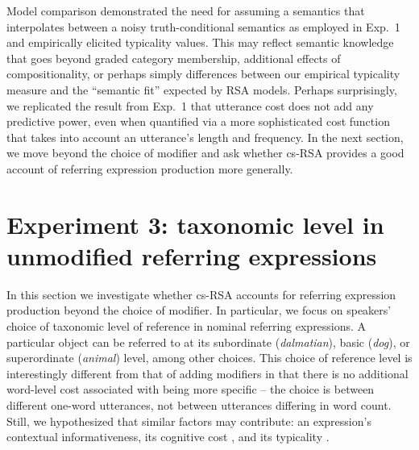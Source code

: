 \documentclass[11pt]{article}
\newcommand{\jd}[1]{\textcolor{Red}{[jd: #1]}}
\newcommand{\ndg}[1]{\textcolor{Green}{[ndg: #1]}}
\begin{document}
Model comparison demonstrated the need for assuming a semantics that interpolates between a noisy truth-conditional semantics as employed in Exp.~1 and empirically elicited typicality values. 
This may reflect semantic knowledge that goes beyond graded category membership, additional effects of compositionality, or perhaps simply differences between our empirical typicality measure and the ``semantic fit'' expected by RSA models.
Perhaps surprisingly, we replicated the result from Exp.~1 that utterance cost does not add any predictive power, even when quantified via a more sophisticated cost function that takes into account an utterance's length and frequency.
In the next section, we move beyond the choice of modifier and ask whether cs-RSA provides a good account of  referring expression production more generally.

\section[]{Experiment 3: taxonomic level in unmodified referring expressions}
\label{sec:nominal}

In this section we investigate whether cs-RSA accounts for referring expression production beyond the choice of modifier. 
In particular, we focus on speakers' choice of taxonomic level of reference in nominal referring expressions. 
A particular object can be referred to at its subordinate (\emph{dalmatian}), basic (\emph{dog}), or superordinate (\emph{animal}) level, among other choices.
This choice of reference level is interestingly different from that of adding modifiers in that there is no additional word-level cost associated with being more specific -- the choice is between different one-word utterances, not between utterances differing in word count. 
Still, we hypothesized that similar factors may contribute: an expression's contextual informativeness, its cognitive cost \cite<short and frequent terms are preferred over long and infrequent ones,>{griffin1998,jescheniak1994}, and its typicality \cite<an utterance is more likely to be used if the object is a good instance of it,> {Jolicoeur1984}.
\end{document}
